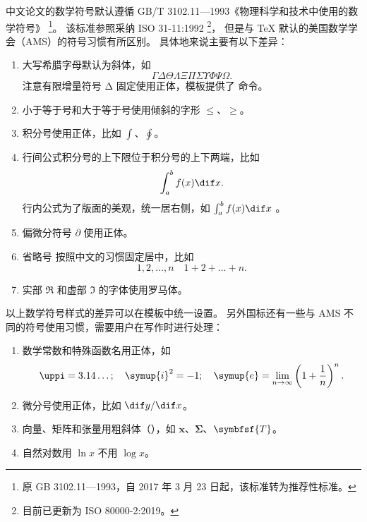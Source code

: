 中文论文的数学符号默认遵循 GB/T 3102.11—1993《物理科学和技术中使用的数学符号》
\footnote{原 GB 3102.11—1993，自 2017 年 3 月 23 日起，该标准转为推荐性标准。}。
该标准参照采纳 ISO 31-11:1992 \footnote{目前已更新为 ISO 80000-2:2019。}，
但是与 \TeX{} 默认的美国数学学会（AMS）的符号习惯有所区别。
具体地来说主要有以下差异：
\begin{enumerate}
  \item 大写希腊字母默认为斜体，如
    \begin{equation*}
      \Gamma \Delta \Theta \Lambda \Xi \Pi \Sigma \Upsilon \Phi \Psi \Omega.
    \end{equation*}
    注意有限增量符号 $\increment$ 固定使用正体，模板提供了  命令。
  \item 小于等于号和大于等于号使用倾斜的字形 $\le$、$\ge$。
  \item 积分号使用正体，比如 $\int$、$\oint$。
  \item 行间公式积分号的上下限位于积分号的上下两端，比如
    \begin{equation*}
      \int_a^b f(x) \dif x.
    \end{equation*}
    行内公式为了版面的美观，统一居右侧，如 $\int_a^b f(x) \dif x$ 。
  \item
    偏微分符号 $\partial$ 使用正体。
  \item
    省略号  按照中文的习惯固定居中，比如
    \begin{equation*}
      1, 2, \dots, n \quad 1 + 2 + \dots + n.
    \end{equation*}
  \item
    实部 $\Re$ 和虚部 $\Im$ 的字体使用罗马体。
\end{enumerate}

以上数学符号样式的差异可以在模板中统一设置。
另外国标还有一些与 AMS 不同的符号使用习惯，需要用户在写作时进行处理：
\begin{enumerate}
  \item 数学常数和特殊函数名用正体，如
    \begin{equation*}
      \uppi = 3.14\dots; \quad
      \symup{i}^2 = -1; \quad
      \symup{e} = \lim_{n \to \infty} \left( 1 + \frac{1}{n} \right)^n.
    \end{equation*}
  \item 微分号使用正体，比如 $\dif y / \dif x$。
  \item 向量、矩阵和张量用粗斜体（），如 $\symbf{x}$、$\symbf{\Sigma}$、$\symbfsf{T}$。
  \item 自然对数用 $\ln x$ 不用 $\log x$。
\end{enumerate}


